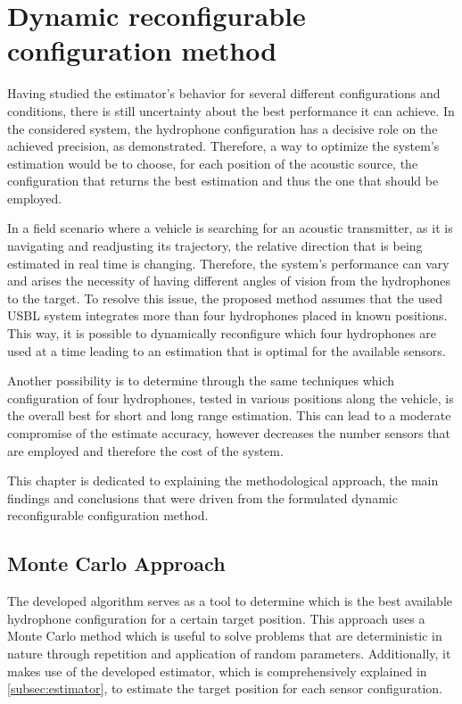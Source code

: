 \chapter{Dynamic reconfigurable configuration method}  \label{chap:study}

Having studied the estimator's behavior for several different configurations and conditions, there is still uncertainty about the best performance it can achieve. In the considered system, the hydrophone configuration has a decisive role on the achieved precision, as demonstrated. Therefore, a way to optimize the system's estimation would be to choose, for each position of the acoustic source, the configuration that returns the best estimation and thus the one that should be employed.

In a field scenario where a vehicle is searching for an acoustic transmitter, as it is navigating and readjusting its trajectory, the relative direction that is being estimated in real time is changing. Therefore, the system's performance can vary and arises the necessity of having different angles of vision from the hydrophones to the target. To resolve this issue, the proposed method assumes that the used USBL system integrates more than four hydrophones placed in known positions. This way, it is possible to dynamically reconfigure which four hydrophones are used at a time leading to an estimation that is optimal for the available sensors. 

Another possibility is to determine through the same techniques which configuration of four hydrophones, tested in various positions along the vehicle, is the overall best for short and long range estimation. This can lead to a moderate compromise of the estimate accuracy, however decreases the number sensors that are employed and therefore the cost of the system.

This chapter is dedicated to explaining the methodological approach, the main findings and conclusions that were driven from the formulated dynamic reconfigurable configuration method.


\section{Monte Carlo Approach} \label{sec:config-perf}

The developed algorithm serves as a tool to determine which is the best available hydrophone configuration for a certain target position. This approach uses a Monte Carlo method which is useful to solve problems that are deterministic in nature through repetition and application of random parameters. Additionally, it makes use of the developed estimator, which is comprehensively explained in \ref{subsec:estimator}, to estimate the target position for each sensor configuration.
		
